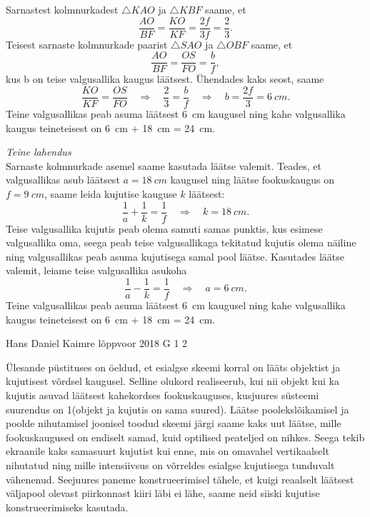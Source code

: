\documentclass[11pt, twoside]{article}
\begin{document}
{{Sarnastest kolmnurkadest $\triangle KAO$ ja $\triangle KBF$ saame, et
\[ \frac{AO}{BF} = \frac{KO}{KF} = \frac{2f}{3f} = \frac{2}{3}. \]
Teisest sarnaste kolmnurkade paarist $\triangle SAO$ ja $\triangle OBF$ saame, et
\[ \frac{AO}{BF} = \frac{OS}{FO} = \frac{b}{f}, \]
kus b on teise valgusallika kaugus läätsest. Ühendades kaks seost, saame
\[ \frac{KO}{KF}=\frac{OS}{FO} \quad\Rightarrow\quad \frac{2}{3} = \frac{b}{f} \quad\Rightarrow\quad b = \frac{2f}{3} = \SI{6}{cm}. \]
Teine valgusallikas peab asuma läätsest \SI{6}{cm} kaugusel ning kahe valgusallika kaugus teineteisest on \SI{6}{cm} + \SI{18}{cm} = \SI{24}{cm}.

\vspace{\baselineskip}
\emph{Teine lahendus}\\
Sarnaste kolmnurkade asemel saame kasutada läätse valemit. Teades, et valgusallikas asub läätsest $a = \SI{18}{cm}$ kaugusel ning läätse fookuskaugus on $f=\SI{9}{cm}$, saame leida kujutise kauguse $k$ läätsest:
\[ \frac{1}{a} + \frac{1}{k} = \frac{1}{f} \quad\Rightarrow\quad k = \SI{18}{cm}. \]
Teise valgusallika kujutis peab olema samuti samas punktis, kus esimese valgusallika oma, seega peab teise valgusallikaga tekitatud kujutis olema näiline ning valgusallikas peab asuma kujutisega samal pool läätse. Kasutades läätse valemit, leiame teise valgusallika asukoha
\[ \frac{1}{a} - \frac{1}{k} = \frac{1}{f} \quad\Rightarrow\quad a = \SI{6}{cm}. \]
Teine valgusallikas peab asuma läätsest \SI{6}{cm} kaugusel ning kahe valgusallika kaugus teineteisest on \SI{6}{cm} + \SI{18}{cm} = \SI{24}{cm}.
\fi
}

{Hans Daniel Kaimre} %
{lõppvoor} %
{2018} %
{G 1} %
{2} %
{

\ifSolution
Ülesande püstituses on öeldud, et esialgse skeemi korral on lääts objektist ja kujutisest võrdsel kaugusel. Selline olukord realiseerub, kui nii objekt kui ka kujutis asuvad läätsest kahekordses fookuskauguses, kusjuures süsteemi suurendus on 1(objekt ja kujutis on sama suured). Läätse poolekslõikamisel ja poolde nihutamisel joonisel toodud skeemi järgi saame kaks uut läätse, mille fookuskaugused on endiselt samad, kuid optilised peateljed on nihkes. Seega tekib ekraanile kaks samasuurt kujutist kui enne, mis on omavahel vertikaalselt nihutatud ning mille intensiivsus on võrreldes esialgse kujutisega tunduvalt vähenenud. Seejuures paneme konstrueerimisel tähele, et kuigi reaalselt läätsest väljapool olevast piirkonnast kiiri läbi ei lähe, saame neid siiski kujutise konstrueerimiseks kasutada.

}}
\end{document}
